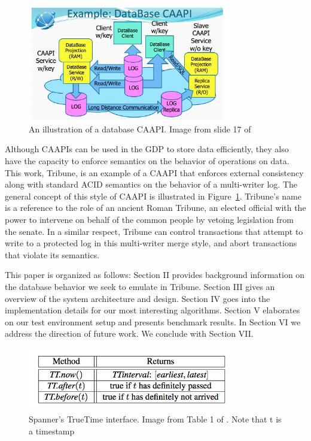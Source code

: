 \documentclass[10pt,twocolumn]{article}
\begin{document}
\begin{figure}[!b]
  \begin{center}
    \includegraphics[width=3.5in]{Images/Database_CAAPI.png}
  \end{center}

  \caption{\small An illustration of a database CAAPI. Image from slide 17 of \cite{Kubiatowicz14_EnablingSwarmThroughGlobalDataPlane} }
  \label{Database_CAAPI}
\end{figure}

Although CAAPIs can be used in the GDP to store data efficiently, they also have the capacity to  enforce semantics on the behavior of operations on data. This work, Tribune, is an example of a CAAPI that enforces external consistency along with standard ACID semantics on the behavior of a multi-writer log. The general concept of this style of CAAPI is illustrated in Figure~\ref{Database_CAAPI}. Tribune's name is a reference to the role of an ancient Roman Tribune, an elected official with the power to intervene on behalf of the common people by vetoing legislation from the senate. In a similar respect, Tribune can control transactions that attempt to write to a protected log in this multi-writer merge style, and abort transactions that violate its semantics. 

This paper is organized as follows: Section II provides background information on the database behavior we seek to emulate in Tribune. Section III gives an overview of the system architecture and design. Section IV goes into the implementation details for our most interesting algorithms. Section V elaborates on our test environment setup and presents benchmark results. In Section VI we address the direction of future work. We conclude with Section VII.


\begin{figure}[!b]
  \begin{center}
    \includegraphics[width=3.5in]{Images/TrueTime.png}
  \end{center}

  \caption{\small Spanner's TrueTime interface. Image from Table 1 of \cite{corbett_spanner:_2012}. Note that t is a timestamp }
  \label{TrueTime}
\end{figure}
\end{document}
